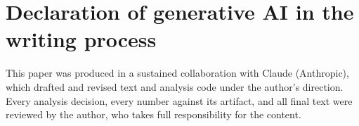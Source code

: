 \section*{Declaration of generative AI in the writing process}
This paper was produced in a sustained collaboration with Claude
(Anthropic), which drafted and revised text and analysis code under the
author's direction. Every analysis decision, every number against its
artifact, and all final text were reviewed by the author, who takes full
responsibility for the content.
